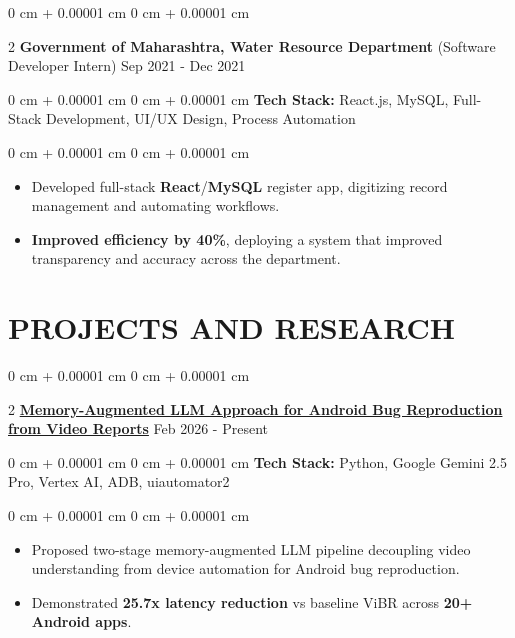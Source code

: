 \documentclass[9pt, letterpaper]{article}
\newenvironment{highlights}{
    \begin{itemize}[
        topsep=0.05 cm,
        parsep=0 pt,
        partopsep=0pt,
        itemsep=0pt,
        leftmargin=10pt
    ]
}{
    \end{itemize}
} %
\newenvironment{onecolentry}{
    \begin{adjustwidth}{
        0 cm + 0.00001 cm}{
        0 cm + 0.00001 cm}
}{
    \end{adjustwidth}
} %
\newenvironment{twocolentry}[2][]{
    \onecolentry
    \def\secondColumn{#2}
    \setcolumnwidth{\fill, 4.5 cm}
    \begin{paracol}{2}
}{
    \switchcolumn \raggedleft \secondColumn
    \end{paracol}
    \endonecolentry
} %
\begin{document}
    \begin{twocolentry}{Sep 2021 - Dec 2021}\textbf{Government of Maharashtra, Water Resource Department} (Software Developer Intern)\end{twocolentry}
    \begin{onecolentry}\textbf{Tech Stack:} React.js, MySQL, Full-Stack Development, UI/UX Design, Process Automation \end{onecolentry}
    \begin{onecolentry}
        \begin{highlights}
            \item Developed full-stack \textbf{React}/\textbf{MySQL} register app, digitizing record management and automating workflows.
            \item \textbf{Improved efficiency by 40\%}, deploying a system that improved transparency and accuracy across the department.
        \end{highlights}
    \end{onecolentry}

\section{PROJECTS AND RESEARCH}

    \begin{twocolentry}
        {Feb 2026 - Present}\href{https://github.com/Tanmayb05/gifdroid-reproduction}{\textbf{Memory-Augmented LLM Approach for Android Bug Reproduction from Video Reports}}    \end{twocolentry}
    \begin{onecolentry}\textbf{Tech Stack:} Python, Google Gemini 2.5 Pro, Vertex AI, ADB, uiautomator2 \end{onecolentry}
    \begin{onecolentry}
        \begin{highlights}
            \item Proposed two-stage memory-augmented LLM pipeline decoupling video understanding from device automation for Android bug reproduction.
            \item Demonstrated \textbf{25.7x latency reduction} vs baseline ViBR across \textbf{20+ Android apps}.
        \end{highlights}
    \end{onecolentry}
    \vspace{0.04 cm}
\end{document}
